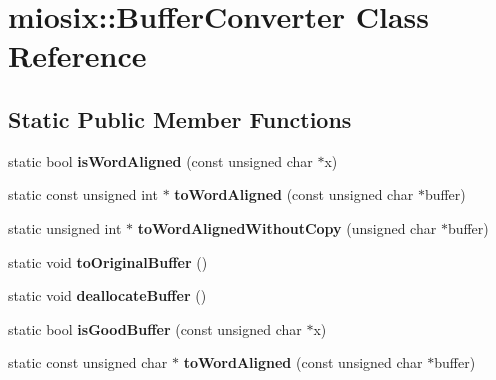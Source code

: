 \hypertarget{classmiosix_1_1_buffer_converter}{\section{miosix\-:\-:Buffer\-Converter Class Reference}
\label{classmiosix_1_1_buffer_converter}
}
\subsection*{Static Public Member Functions}
\begin{DoxyCompactItemize}
\item 
\hypertarget{classmiosix_1_1_buffer_converter_adcd755096accf2d078e5ba9784a843e0}{static bool {\bfseries is\-Word\-Aligned} (const unsigned char $\ast$x)}\label{classmiosix_1_1_buffer_converter_adcd755096accf2d078e5ba9784a843e0}

\item 
\hypertarget{classmiosix_1_1_buffer_converter_a533012a5869c6bbc0243d375ed4e28d4}{static const unsigned int $\ast$ {\bfseries to\-Word\-Aligned} (const unsigned char $\ast$buffer)}\label{classmiosix_1_1_buffer_converter_a533012a5869c6bbc0243d375ed4e28d4}

\item 
\hypertarget{classmiosix_1_1_buffer_converter_a72b3e0421a3e39fc0667974c9ae1009d}{static unsigned int $\ast$ {\bfseries to\-Word\-Aligned\-Without\-Copy} (unsigned char $\ast$buffer)}\label{classmiosix_1_1_buffer_converter_a72b3e0421a3e39fc0667974c9ae1009d}

\item 
\hypertarget{classmiosix_1_1_buffer_converter_ad2d48da3f742b13c02dd60d41aa08978}{static void {\bfseries to\-Original\-Buffer} ()}\label{classmiosix_1_1_buffer_converter_ad2d48da3f742b13c02dd60d41aa08978}

\item 
\hypertarget{classmiosix_1_1_buffer_converter_a538d67d263c094f225216b839407efaf}{static void {\bfseries deallocate\-Buffer} ()}\label{classmiosix_1_1_buffer_converter_a538d67d263c094f225216b839407efaf}

\item 
\hypertarget{classmiosix_1_1_buffer_converter_a73715b539f5bab94197af0af49d1a1c9}{static bool {\bfseries is\-Good\-Buffer} (const unsigned char $\ast$x)}\label{classmiosix_1_1_buffer_converter_a73715b539f5bab94197af0af49d1a1c9}

\item 
\hypertarget{classmiosix_1_1_buffer_converter_a3ca9e6b06c6b453826598c091ff57564}{static const unsigned char $\ast$ {\bfseries to\-Word\-Aligned} (const unsigned char $\ast$buffer)}\label{classmiosix_1_1_buffer_converter_a3ca9e6b06c6b453826598c091ff57564}


\end{DoxyCompactItemize}
